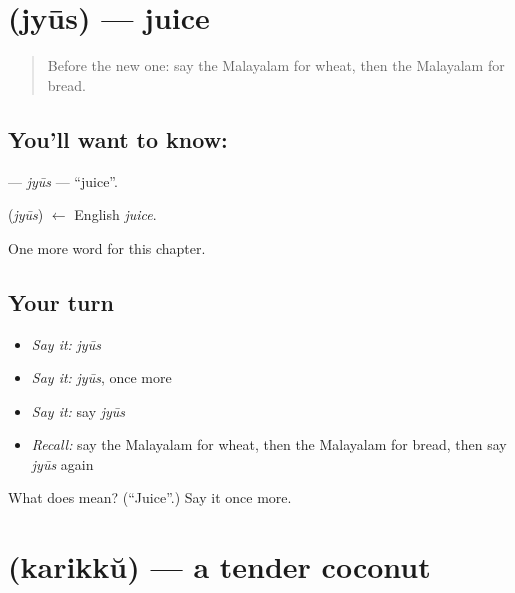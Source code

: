 \section[\texorpdfstring{\ml{ജ്യൂസ്} (jyūs)}{ജ്യൂസ് (jyūs)}]{ (jyūs) — juice}

\label{lesson:ML-C249-jyus}



\begin{quote}
Before the new one: say the Malayalam for wheat, then the Malayalam for bread.
\end{quote}

\subsection*{You'll want to know: }
\textbf{} — \emph{jyūs} — \textquotedblleft{}juice\textquotedblright{}.

\begin{cousinweb}
\textbf{} (\emph{jyūs}) $\leftarrow$ English \emph{juice}.
\end{cousinweb}

\begin{grammarlens}[title={What you've built}]
One more word for this chapter.
\end{grammarlens}

\subsection*{Your turn}
\begin{itemize}
\raggedright
  \item \emph{Say it:} \emph{jyūs}
  \item \emph{Say it:} \emph{jyūs}, once more
  \item \emph{Say it:} say \emph{jyūs}
  \item \emph{Recall:} say the Malayalam for wheat, then the Malayalam for bread, then say \emph{jyūs} again
\end{itemize}

\begin{tcolorbox}[breakable,colback=teal!4,colframe=teal!35!black,title={Before you move on}]
What does  mean? (\textquotedblleft{}Juice\textquotedblright{}.) Say it once more.
\end{tcolorbox}
\section[\texorpdfstring{\ml{കരിക്ക്} (karikkŭ)}{കരിക്ക് (karikkŭ)}]{ (karikkŭ) — a tender coconut}


